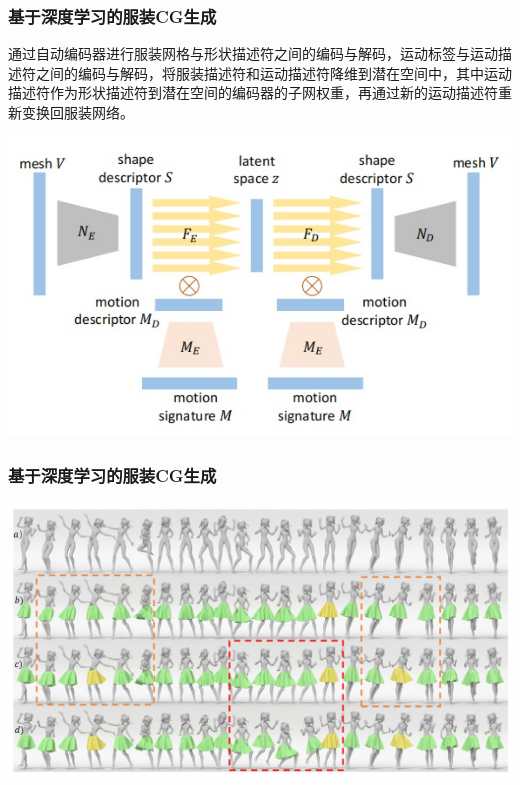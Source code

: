 \documentclass[aspectratio=43]{ctexbeamer}
\begin{document}
\begin{frame}
  \frametitle{基于深度学习的服装CG生成}
​		\; \;通过自动编码器进行服装网格与形状描述符之间的编码与解码，运动标签与运动描述符之间的编码与解码，将服装描述符和运动描述符降维到潜在空间中，其中运动描述符作为形状描述符到潜在空间的编码器的子网权重，再通过新的运动描述符重新变换回服装网络。

        \begin{center}
            \includegraphics[width=0.6\linewidth]{./fig/auto-encode.jpg}
        \end{center}
\end{frame}

\begin{frame}
  \frametitle{基于深度学习的服装CG生成}
        \begin{center}
            \includegraphics[width=1.0\linewidth]{./fig/animation.jpg}
        \end{center}
\end{frame}
\end{document}
